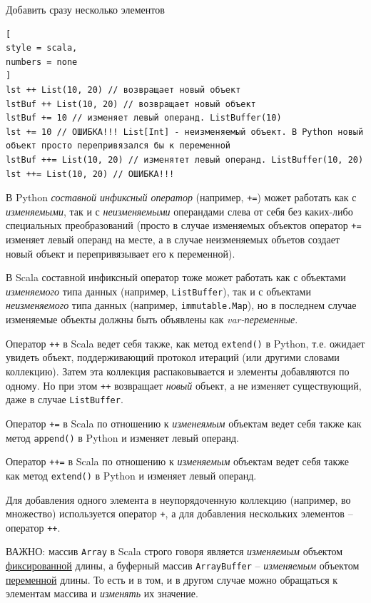 \documentclass[%
	11pt,
	a4paper,
	utf8,
		]{article}
\begin{document}
Добавить сразу несколько элементов
\begin{lstlisting}[
style = scala,
numbers = none	
]
lst ++ List(10, 20) // возвращает новый объект
lstBuf ++ List(10, 20) // возвращает новый объект
lstBuf += 10 // изменяет левый операнд. ListBuffer(10)
lst += 10 // ОШИБКА!!! List[Int] - неизменяемый объект. В Python новый объект просто перепривязался бы к переменной
lstBuf ++= List(10, 20) // изменятет левый операнд. ListBuffer(10, 20)
lst ++= List(10, 20) // ОШИБКА!!!
\end{lstlisting}

В Python \emph{составной инфиксный оператор} (например, \texttt{+=}) может работать как с \emph{изменяемыми}, так и с \emph{неизменяемыми} операндами слева от себя без каких-либо специальных преобразований (просто в случае изменяемых объектов оператор \texttt{+=} изменяет левый операнд на месте, а в случае неизменяемых объетов создает новый объект и перепривязывает его к переменной).

В Scala составной инфиксный оператор тоже может работать как с объектами \emph{изменяемого} типа данных (например, \texttt{ListBuffer}), так и с объектами \emph{неизменяемого} типа данных (например, \texttt{immutable.Map}), но в последнем случае изменяемые объекты должны быть объявлены как \emph{var-переменные}.

Оператор \texttt{++} в Scala ведет себя также, как метод \texttt{extend()} в Python, т.е. ожидает увидеть объект, поддерживающий протокол итераций (или другими словами коллекцию). Затем эта коллекция распаковывается и элементы добавляются по одному. Но при этом \texttt{++} возвращает \emph{новый} объект, а не изменяет существующий, даже в случае \texttt{ListBuffer}.

Оператор \texttt{+=} в Scala по отношению к \emph{изменеямым} объектам ведет себя также как метод \texttt{append()} в Python и изменяет левый операнд.

Оператор \texttt{++=} в Scala по отношению к \emph{изменяемым} объектам ведет себя также как метод \texttt{extend()} в Python и изменяет левый операнд.

Для добавления одного элемента в неупорядоченную коллекцию (например, во множество) используется оператор \texttt{+}, а для добавления нескольких элементов -- оператор \texttt{++}.

ВАЖНО: массив \texttt{Array} в Scala строго говоря является \emph{изменяемым} объектом \underline{фиксированной} длины, а буферный массив \texttt{ArrayBuffer} -- \emph{изменяемым} объектом \underline{переменной} длины. То есть и в том, и в другом случае можно обращаться к элементам массива и \emph{изменять} их значение.
\end{document}
